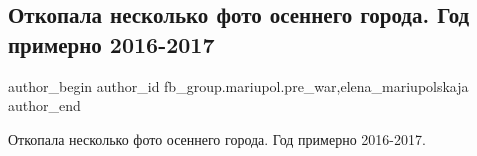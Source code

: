  
 
 
 
 

\subsection{Откопала несколько фото осеннего города. Год примерно 2016-2017}
\label{sec:16_02_2023.fb.fb_group.mariupol.pre_war.6.otkopala_neskolko_fo}
 
\ifcmt
 author_begin
   author_id fb_group.mariupol.pre_war,elena_mariupolskaja
 author_end
\fi

Откопала несколько фото осеннего города. Год примерно 2016-2017.

